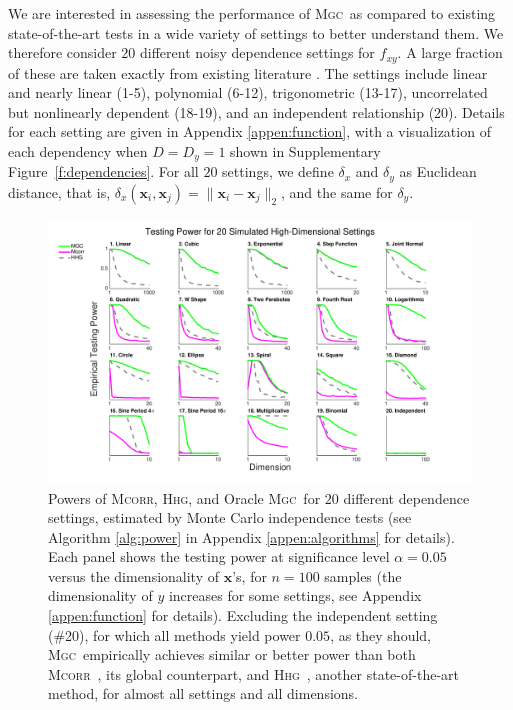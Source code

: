 \documentclass[11pt]{article}
\providecommand{\sct}[1]{{\normalfont\textsc{#1}}}
\providecommand{\mb}[1]{\boldsymbol{#1}}
\newcommand{\Mgc}{\sct{Mgc}}
\newcommand{\Hhg}{\sct{Hhg}}
\newcommand{\Mcorr}{\sct{Mcorr}}
\begin{document}
We are interested in assessing the performance of \Mgc~as compared to existing state-of-the-art tests in a wide variety of settings to better understand them.  
We therefore consider $20$ different  noisy dependence settings for $f_{xy}$. A large fraction of these are taken exactly from existing literature \cite{SzekelyRizzoBakirov2007, SimonTibshirani2012, GorfineHellerHeller2012, HellerGorfine2013}.  
The settings include
linear and nearly linear  (1-5),
polynomial   (6-12),
trigonometric (13-17),
uncorrelated but nonlinearly dependent  (18-19),
and an independent relationship (20).
Details for each setting are given in Appendix \ref{appen:function}, with a visualization of each dependency when $D=D_y=1$ shown in Supplementary Figure~\ref{f:dependencies}. For all $20$ settings, we define  $\delta_x$ and $\delta_y$  as  Euclidean distance, that is, $\delta_x(\mb{x}_i,\mb{x}_j) = \|\mb{x}_i - \mb{x}_j\|_{2}$, and the same for $\delta_y$.


\begin{figure}[htbp]
\includegraphics[width=1.0\textwidth]{Figures/FigHDPower}
\caption{Powers of \Mcorr, \Hhg, and Oracle \Mgc~for $20$ different dependence settings, estimated by Monte Carlo independence tests (see Algorithm \ref{alg:power} in Appendix \ref{appen:algorithms} for details).  
Each panel shows the testing power at significance level $\alpha=0.05$
%
%
%
%
%
versus the dimensionality of $\mb{x}$'s, for $n=100$ samples (the dimensionality of $y$ increases for some settings, see Appendix \ref{appen:function} for details). 
Excluding the independent  setting (\#20), for which all methods yield power $0.05$, as they should, \Mgc~empirically achieves similar or better power than both \Mcorr~\cite{SzekelyRizzo2013a}, its global counterpart, and \Hhg~\cite{HellerGorfine2013}, another state-of-the-art method, for almost all settings and all dimensions. 
}
\label{f:nD}
\end{figure}
\end{document}
